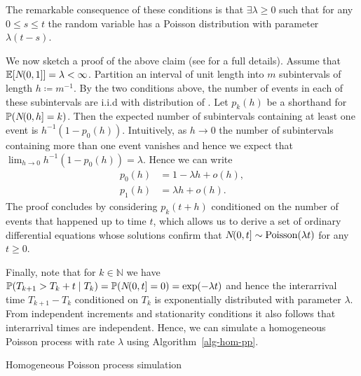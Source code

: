 \documentclass[report.tex]{subfiles}
\begin{document}
\noindent
The remarkable consequence of these conditions is that $\exists \lambda \geq 0$
such that for any $0 \leq s \leq t$ the random variable
 has a Poisson distribution with parameter $\lambda(t-s)$.

We now sketch a proof of the above claim
(see \cite{feller1968Introduction} for a full details).
Assume that $\mathbb{E}\!\left[{{N}\!({0},{1}]}\right] = \lambda < \infty$.
Partition an interval of unit length into $m$ subintervals of length
$h \coloneqq m^{-1}$. By the two conditions above, the number of events in each
of these subintervals are i.i.d with distribution of .
Let $p_{k}(h)$ be a shorthand for $\mathbb{P}\!\left({{N}\!({0},{h}] = k}\right)$.
Then the expected number of subintervals containing at least one event is
$h^{-1}(1 - p_{0}(h))$.
Intuitively, as $h \to 0$ the number of subintervals containing more than one
event vanishes and hence we expect that
$\lim_{h \to 0}h^{-1}(1 - p_{0}(h)) = \lambda$.
Hence we can write
\begin{equation}
\begin{split}
  \label{hom-pp-characterization}
  p_{0}(h) &= 1 - \lambda h + o(h), \\
  p_{1}(h) &= \lambda h + o(h).
\end{split}
\end{equation}
The proof concludes by considering $p_{k}(t + h)$ conditioned on the number of
events that happened up to time $t$, which allows us to derive a set of ordinary
differential equations whose solutions confirm that
${N}\!({0},{t}] \sim \text{Poisson}(\lambda t)$ for any $t \geq 0$.

Finally, note that for $k \in \mathbb{N}$ we have
$
  \mathbb{P}\!\left({T_{k+1} > T_{k} + t} \mid {T_{k}}\right)
  = \mathbb{P}\!\left({{N}\!({0},{t}] = 0}\right)
  = \exp\!\left({-\lambda t}\right)
$
and hence the interarrival time $T_{k+1} - T_{k}$ conditioned on $T_{k}$
is exponentially distributed with parameter $\lambda$. From independent
increments and stationarity conditions it also follows that interarrival times
are independent. Hence, we can simulate a homogeneous Poisson process
with rate $\lambda$ using Algorithm~\ref{alg-hom-pp}.

\begin{algorithm}
\caption{Homogeneous Poisson process simulation}
\label{alg-hom-pp}
\begin{algorithmic}
  \EndFor
\end{algorithmic}
\end{algorithm}
\end{document}
